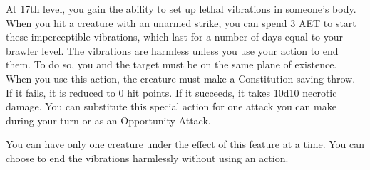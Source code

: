 At 17th level, you gain the ability to set up lethal vibrations in someone's body. When you hit a creature with an unarmed strike, you can spend 3 AET to start these imperceptible vibrations, which last for a number of days equal to your brawler level. The vibrations are harmless unless you use your action to end them. To do so, you and the target must be on the same plane of existence. When you use this action, the creature must make a Constitution saving throw. If it fails, it is reduced to 0 hit points. If it succeeds, it takes 10d10 necrotic damage. You can substitute this special action for one attack you can make during your turn or as an Opportunity Attack.

You can have only one creature under the effect of this feature at a time. You can choose to end the vibrations harmlessly without using an action.

